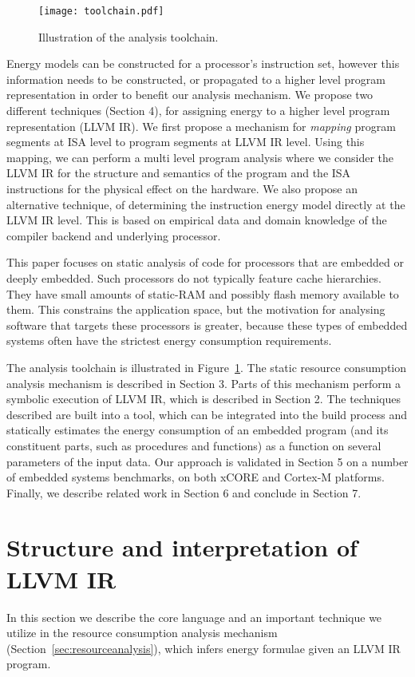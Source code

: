 \documentclass[9pt,preprint]{sigplanconf}
\newcommand{\figlabel}[1]{\label{fig:#1}}
\newcommand{\figref}[1]{Figure~\ref{fig:#1}}
\newcommand{\seclabel}[1]{\label{sec:#1}}
\newcommand{\secref}[1]{Section~\ref{sec:#1}}
\begin{document}
\begin{figure}[hb]
\centering
\texttt{[image: toolchain.pdf]}
\caption{\figlabel{llvmiranalysis}Illustration of the analysis toolchain.}
\end{figure}

Energy models can be constructed for a processor's instruction set, however this
information needs to be constructed, or propagated to a higher level program
representation in order to benefit our analysis mechanism. We propose two
different techniques (Section 4), for assigning energy to a
higher level program representation (LLVM IR).
We first propose a mechanism for \emph{mapping} program segments at ISA level
to program segments at LLVM IR level. Using this mapping, we can perform a multi
level program analysis where we consider the LLVM IR for the structure and semantics
of the program and the ISA instructions for the physical effect on the
hardware. We also propose an alternative technique, of determining
the instruction energy model directly at the LLVM IR level. This is based on
empirical data and domain knowledge of the compiler backend and underlying processor.

This paper focuses on static analysis of code for processors that are embedded
or deeply embedded. Such processors do not typically feature cache hierarchies.
They have small amounts of static-RAM and possibly flash memory available to
them. This constrains the application space, but the motivation for analysing
software that targets these processors is greater, because these types of
embedded systems often have the strictest energy consumption requirements.

The analysis toolchain is illustrated in \figref{llvmiranalysis}. The static
resource consumption analysis mechanism is described in Section 3. Parts of this mechanism
perform a symbolic execution of LLVM IR, which is described in Section 2. The
techniques described are built into a tool, which can be integrated into the
build process and statically estimates the energy consumption of an embedded
program (and its constituent parts, such as procedures and functions) as a
function on several parameters of the input data. Our approach is validated in
Section 5 on a number of embedded systems benchmarks, on both xCORE and Cortex-M
platforms. Finally, we describe related work in Section 6 and conclude in
Section 7.

\section{Structure and interpretation of LLVM IR}
\seclabel{statLLVMIR}
In this section we describe the core language and an important technique we
utilize in the resource consumption analysis mechanism (\secref{resourceanalysis}), which
infers energy formulae given an LLVM IR program.
\end{document}
